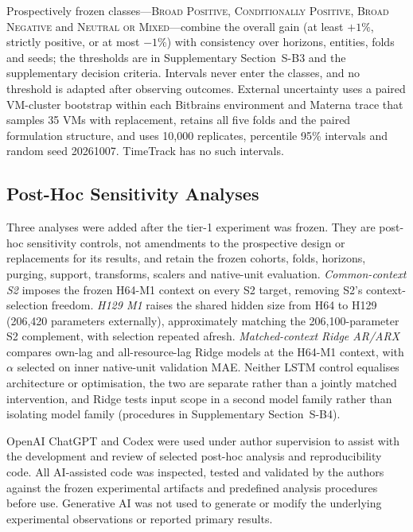 \documentclass[5p,twocolumn]{elsarticle}
\begin{document}
Prospectively frozen classes---\textsc{Broad Positive},
\textsc{Conditionally Positive}, \textsc{Broad Negative} and
\textsc{Neutral or Mixed}---combine the overall gain (at least $+1\%$,
strictly positive, or at most $-1\%$) with consistency over horizons,
entities, folds and seeds; the thresholds are in Supplementary
Section~S-B3 and the supplementary decision criteria. Intervals never enter
the classes, and no threshold is adapted after observing outcomes. External
uncertainty uses a paired VM-cluster bootstrap within each Bitbrains
environment and Materna trace that samples 35 VMs with replacement, retains
all five folds and the paired formulation structure, and uses 10,000
replicates, percentile 95\% intervals and random seed 20261007. TimeTrack has
no such intervals.

\subsection{Post-Hoc Sensitivity Analyses}
\label{sec:posthoc-controls}

Three analyses were added after the tier-1 experiment was frozen. They are
post-hoc sensitivity controls, not amendments to the prospective design or
replacements for its results, and retain the frozen cohorts, folds, horizons,
purging, support, transforms, scalers and native-unit evaluation.
\emph{Common-context S2} imposes the frozen H64-M1 context on every S2 target,
removing S2's context-selection freedom. \emph{H129 M1} raises the shared
hidden size from H64 to H129 (206,420 parameters externally), approximately
matching the 206,100-parameter S2 complement, with selection repeated afresh.
\emph{Matched-context Ridge AR/ARX} compares own-lag and all-resource-lag
Ridge models at the H64-M1 context, with $\alpha$ selected on inner
native-unit validation MAE. Neither LSTM control equalises architecture or
optimisation, the two are separate rather than a jointly matched
intervention, and Ridge tests input scope in a second model family rather
than isolating model family (procedures in Supplementary Section~S-B4).

OpenAI ChatGPT and Codex were used under author supervision to assist with the
development and review of selected post-hoc analysis and reproducibility code.
All AI-assisted code was inspected, tested and validated by the authors against
the frozen experimental artifacts and predefined analysis procedures before
use. Generative AI was not used to generate or modify the underlying
experimental observations or reported primary results.
\end{document}
